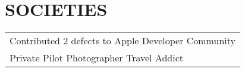 \documentclass[a4paper]{lyu-resume} %
\begin{document}
\begin{minipage}[t]{0.66\textwidth}
\sectionspace %

\section{SOCIETIES} 

\begin{tabular}{l}
\textbullet{} Contributed 2 defects to Apple Developer Community\\
\textbullet{} Private Pilot \textbullet{} Photographer \textbullet{} Travel Addict
\end{tabular}

\sectionspace %
\end{minipage} %
\end{document}
